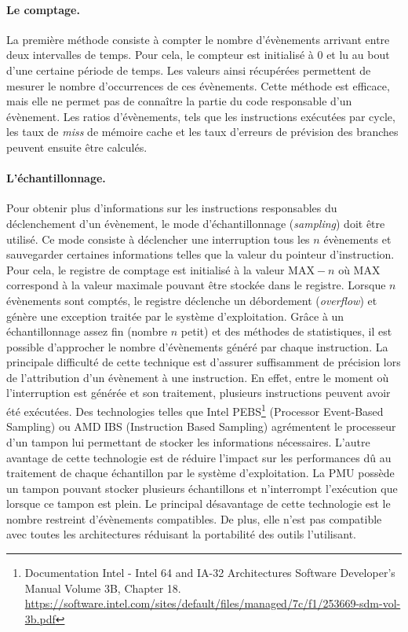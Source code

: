             \paragraph{Le comptage.} 
                
                La première méthode consiste à compter le nombre d'évènements arrivant entre deux intervalles de temps. Pour cela, le compteur est initialisé à $0$ et lu au bout d'une certaine période de temps. Les valeurs ainsi récupérées permettent de mesurer le nombre d'occurrences de ces évènements. Cette méthode est efficace, mais elle ne permet pas de connaître la partie du code responsable d'un évènement. Les ratios d'évènements, tels que les instructions exécutées par cycle, les taux de \textit{miss} de mémoire cache et les taux d'erreurs de prévision des branches peuvent ensuite être calculés.
            
            \paragraph{L'échantillonnage.} 
            
                Pour obtenir plus d'informations sur les instructions responsables du déclenchement d'un évènement, le mode d'échantillonnage (\textit{sampling}) doit être utilisé. Ce mode consiste à déclencher une interruption tous les $n$ évènements et sauvegarder certaines informations telles que la valeur du pointeur d'instruction. Pour cela, le registre de comptage est initialisé à la valeur $\text{MAX} - n$ où $\text{MAX}$ correspond à la valeur maximale pouvant être stockée dans le registre. Lorsque $n$ évènements sont comptés, le registre déclenche un débordement (\textit{overflow}) et génère une exception traitée par le système d'exploitation. Grâce à un échantillonnage assez fin (nombre $n$ petit) et des méthodes de statistiques, il est possible d'approcher le nombre d'évènements généré par chaque instruction. La principale difficulté de cette technique est d'assurer suffisamment de précision lors de l'attribution d'un évènement à une instruction. En effet, entre le moment où l'interruption est générée et son traitement, plusieurs instructions peuvent avoir été exécutées. Des technologies telles que Intel PEBS\footnote{Documentation Intel - Intel 64 and IA-32 Architectures Software Developer's Manual Volume 3B, Chapter 18. \url{https://software.intel.com/sites/default/files/managed/7c/f1/253669-sdm-vol-3b.pdf}} (Processor Event-Based Sampling) ou AMD IBS (Instruction Based Sampling) \cite{Drongowski2007} agrémentent le processeur d'un tampon lui permettant de stocker les informations nécessaires. L'autre avantage de cette technologie est de réduire l'impact sur les performances dû au traitement de chaque échantillon par le système d'exploitation. La PMU possède un tampon pouvant stocker plusieurs échantillons et n'interrompt l'exécution que lorsque ce tampon est plein. Le principal désavantage de cette technologie est le nombre restreint d'évènements compatibles. De plus, elle n'est pas compatible avec toutes les architectures réduisant la portabilité des outils l'utilisant.
      
